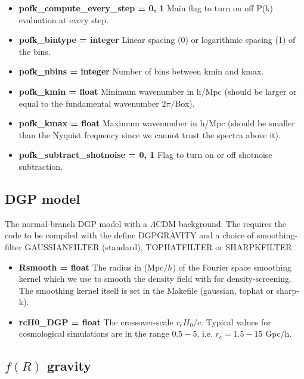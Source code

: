 \documentclass[usenatbib]{article}
\begin{document}
\begin{itemize}

\item \textbf{pofk\_compute\_every\_step = 0, 1} Main flag to turn on off P(k) evaluation at every step.

\item \textbf{pofk\_bintype = integer} Linear spacing (0) or logarithmic spacing (1) of the bins.

\item \textbf{pofk\_nbins = integer} Number of bins between kmin and kmax.

\item \textbf{pofk\_kmin = float} Minimum wavenumber in h/Mpc (should be larger or equal to the fundamental wavenumber $2\pi/$Box).

\item \textbf{pofk\_kmax = float} Maximum wavenumber in h/Mpc (should be smaller than the Nyquist frequency since we cannot trust the spectra above it).

\item \textbf{pofk\_subtract\_shotnoise = 0, 1} Flag to turn on or off shotnoise subtraction.

\end{itemize}

\subsection*{DGP model}

The normal-branch DGP model with a $\Lambda$CDM background. The requires the code to be compiled with the define DGPGRAVITY and a choice of smoothing-filter GAUSSIANFILTER (standard), TOPHATFILTER or SHARPKFILTER.

\begin{itemize}

\item \textbf{Rsmooth = float} The radius in (Mpc$/h$) of the Fourier space smoothing kernel which we use to smooth the density field with for density-screening. The smoothing kernel itself is set in the Makefile (gaussian, tophat or sharp-k).

\item \textbf{rcH0\_DGP = float} The crossover-scale $r_cH_0/c$. Typical values for cosmological simulations are in the range $0.5-5$, i.e. $r_c = 1.5 - 15$ Gpc/h.

\end{itemize}

\subsection*{$f(R)$ gravity}
\end{document}

